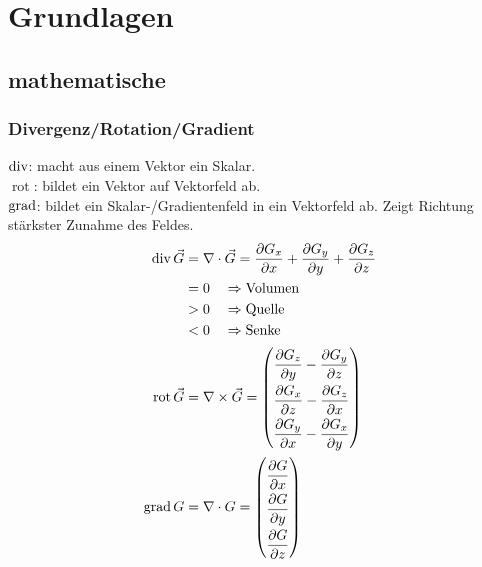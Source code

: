 \section{Grundlagen}
\subsection{mathematische}
\subsubsection*{Divergenz/Rotation/Gradient}

$\operatorname{div}$: macht aus einem Vektor ein Skalar.\\
$\operatorname{rot}$: bildet ein Vektor auf Vektorfeld ab.\\
$\operatorname{grad}$: bildet ein Skalar-/Gradientenfeld in ein Vektorfeld ab.
Zeigt Richtung stärkster Zunahme des Feldes.
\begin{align*}
    \opdiv \vec{G}  &= \nabla \cdot \vec{G} = \dfrac{\partial G_x}{\partial x} + \dfrac{\partial G_y}{\partial y} + \dfrac{\partial G_z}{\partial z}\\
                                &= 0 \quad\Rightarrow \textnormal{Volumen}\\
                                &> 0 \quad\Rightarrow \textnormal{Quelle}\\
                                &< 0 \quad\Rightarrow \textnormal{Senke}\\
    \arraycolsep=1.0pt\def\arraystretch{2.0}
    \operatorname{rot} \vec{G}  &= \nabla \times \vec{G} =
        \begin{pmatrix}
            \dfrac{\partial G_z}{\partial y} - \dfrac{\partial G_y}{\partial z} \\
            \dfrac{\partial G_x}{\partial z} - \dfrac{\partial G_z}{\partial x} \\
            \dfrac{\partial G_y}{\partial x} - \dfrac{\partial G_x}{\partial y} \\
        \end{pmatrix}\\                       
    \arraycolsep=1.0pt\def\arraystretch{2.0}
    \opgrad G       &= \nabla \cdot G =
        \begin{pmatrix}
            \dfrac{\partial G}{\partial x} \\
            \dfrac{\partial G}{\partial y} \\
            \dfrac{\partial G}{\partial z} \\
        \end{pmatrix}                                      
\end{align*}

